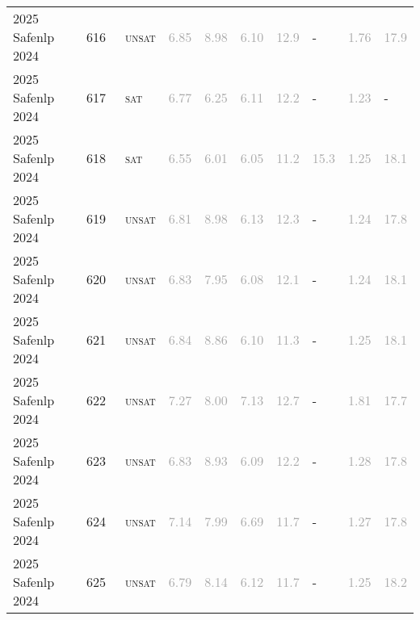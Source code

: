 \begin{center}
{\begin{longtable}{@{}llllllllll@{}}
2025 Safenlp 2024 & 616 & ~\textsc{unsat} & \textcolor{darkgray}{6.85} & \textcolor{darkgray}{8.98} & \textcolor{darkgray}{6.10} & \textcolor{darkgray}{12.9} & - & \textcolor{darkgray}{1.76} & \textcolor{darkgray}{17.9} \\
2025 Safenlp 2024 & 617 & ~\textsc{sat} & \textcolor{darkgray}{6.77} & \textcolor{darkgray}{6.25} & \textcolor{darkgray}{6.11} & \textcolor{darkgray}{12.2} & - & \textcolor{darkgray}{1.23} & - \\
2025 Safenlp 2024 & 618 & ~\textsc{sat} & \textcolor{darkgray}{6.55} & \textcolor{darkgray}{6.01} & \textcolor{darkgray}{6.05} & \textcolor{darkgray}{11.2} & \textcolor{darkgray}{15.3} & \textcolor{darkgray}{1.25} & \textcolor{darkgray}{18.1} \\
2025 Safenlp 2024 & 619 & ~\textsc{unsat} & \textcolor{darkgray}{6.81} & \textcolor{darkgray}{8.98} & \textcolor{darkgray}{6.13} & \textcolor{darkgray}{12.3} & - & \textcolor{darkgray}{1.24} & \textcolor{darkgray}{17.8} \\
2025 Safenlp 2024 & 620 & ~\textsc{unsat} & \textcolor{darkgray}{6.83} & \textcolor{darkgray}{7.95} & \textcolor{darkgray}{6.08} & \textcolor{darkgray}{12.1} & - & \textcolor{darkgray}{1.24} & \textcolor{darkgray}{18.1} \\
2025 Safenlp 2024 & 621 & ~\textsc{unsat} & \textcolor{darkgray}{6.84} & \textcolor{darkgray}{8.86} & \textcolor{darkgray}{6.10} & \textcolor{darkgray}{11.3} & - & \textcolor{darkgray}{1.25} & \textcolor{darkgray}{18.1} \\
2025 Safenlp 2024 & 622 & ~\textsc{unsat} & \textcolor{darkgray}{7.27} & \textcolor{darkgray}{8.00} & \textcolor{darkgray}{7.13} & \textcolor{darkgray}{12.7} & - & \textcolor{darkgray}{1.81} & \textcolor{darkgray}{17.7} \\
2025 Safenlp 2024 & 623 & ~\textsc{unsat} & \textcolor{darkgray}{6.83} & \textcolor{darkgray}{8.93} & \textcolor{darkgray}{6.09} & \textcolor{darkgray}{12.2} & - & \textcolor{darkgray}{1.28} & \textcolor{darkgray}{17.8} \\
2025 Safenlp 2024 & 624 & ~\textsc{unsat} & \textcolor{darkgray}{7.14} & \textcolor{darkgray}{7.99} & \textcolor{darkgray}{6.69} & \textcolor{darkgray}{11.7} & - & \textcolor{darkgray}{1.27} & \textcolor{darkgray}{17.8} \\
2025 Safenlp 2024 & 625 & ~\textsc{unsat} & \textcolor{darkgray}{6.79} & \textcolor{darkgray}{8.14} & \textcolor{darkgray}{6.12} & \textcolor{darkgray}{11.7} & - & \textcolor{darkgray}{1.25} & \textcolor{darkgray}{18.2} \\

\end{longtable}}
\end{center}
